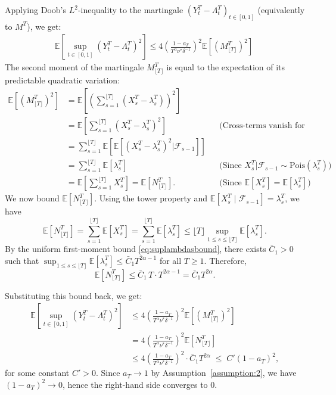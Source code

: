 \documentclass[letterpaper]{article}
\numberwithin{equation}{section}
\theoremstyle{definition}
\theoremstyle{remark}
\begin{document}
  {
  Applying Doob's $L^2$-inequality to the martingale $(Y_t^T-\Lambda_t^T)_{t\in[0,1]}$ (equivalently to $M^T$), we get:
  }
  \begin{align*}
    \mathbb E\left[ \sup_{t\in[0,1]}\left( Y_t^T-\Lambda_t^T \right)^2 \right]
    \le 4 \left( \frac{1-a_T}{T^\alpha \nu^*\delta^{-1}} \right)^2 \mathbb E\left[(M_{\lfloor T\rfloor}^T)^2\right]\
  \end{align*}
  The second moment of the martingale $M_{\lfloor T\rfloor}^T$ is equal to the expectation of its predictable quadratic variation:
  \begin{align*}
    \mathbb E\left[(M_{\lfloor T\rfloor}^T)^2\right] &= \mathbb E\left[ \left( \sum_{s=1}^{\lfloor T\rfloor}(X_s^T-\lambda_s^T) \right)^2 \right] \\
    &= \mathbb E\left[\sum_{s=1}^{\lfloor T\rfloor}(X_s^T-\lambda_s^T)^2\right] && \text{(Cross-terms vanish for martingale differences)} \\
    &= \sum_{s=1}^{\lfloor T\rfloor} \mathbb E\left[ \mathbb E[(X_s^T-\lambda_s^T)^2 | \mathcal{F}_{s-1}] \right] \\
    &= \sum_{s=1}^{\lfloor T\rfloor} \mathbb E[\lambda_s^T] && \text{(Since } X_s^T|\mathcal{F}_{s-1} \sim \text{Pois}(\lambda_s^T)\text{)} \\
    &= \mathbb E\left[ \sum_{s=1}^{\lfloor T\rfloor} X_s^T \right] = \mathbb E[N_{\lfloor T\rfloor}^T]. && \text{(Since } \mathbb E[X_s^T] = \mathbb E[\lambda_s^T]\text{)}
  \end{align*}
  {We now bound $\mathbb E[N_{\lfloor T\rfloor}^T]$.
  Using the tower property and $\mathbb E[X_s^T\mid\mathcal F_{s-1}]=\lambda_s^T$, we have
  \[
  \mathbb E[N_{\lfloor T\rfloor}^T]
  =\sum_{s=1}^{\lfloor T\rfloor}\mathbb E[X_s^T]
  =\sum_{s=1}^{\lfloor T\rfloor}\mathbb E[\lambda_s^T]
  \le \lfloor T\rfloor \sup_{1\le s\le \lfloor T\rfloor}\mathbb E[\lambda_s^T].
  \]
  By the uniform first-moment bound \eqref{eq:suplambdasbound}, there exists $\bar C_1>0$ such that
  $\sup_{1\le s\le \lfloor T\rfloor}\mathbb E[\lambda_s^T]\le \bar C_1 T^{2\alpha-1}$ for all $T\ge1$.
  Therefore,
  \[
  \mathbb E[N_{\lfloor T\rfloor}^T]\le \bar C_1\,T\cdot T^{2\alpha-1}=\bar C_1 T^{2\alpha}.
  \]
  }

 {
  Substituting this bound back, we get:
  }
  \begin{align*}
  \mathbb E\left[ \sup_{t\in[0,1]}\left( Y_t^T-\Lambda_t^T \right)^2 \right]
  &\le 4 \left( \frac{1-a_T}{T^\alpha \nu^*\delta^{-1}} \right)^2 \mathbb E\left[(M_{\lfloor T\rfloor}^T)^2\right] \\
  &= 4 \left( \frac{1-a_T}{T^\alpha \nu^*\delta^{-1}} \right)^2 \mathbb E\left[N_{\lfloor T\rfloor}^T\right] \\
  &\le 4 \left( \frac{1-a_T}{T^\alpha \nu^*\delta^{-1}} \right)^2 \cdot \bar C_1 T^{2\alpha}
  \;\le\; C' (1-a_T)^2,
  \end{align*}
  {
  for some constant $C'>0$. Since $a_T\to 1$ by Assumption~\ref{assumption:2}, we have $(1-a_T)^2\to 0$, hence the right-hand side converges to $0$.
  }
\end{document}
